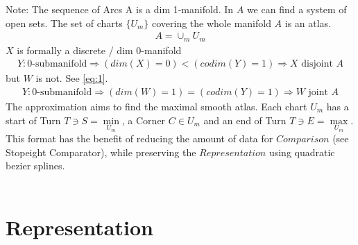 \documentclass{report}
\begin{document}
Note: The sequence of Arcs A is a dim 1-manifold. In $A$ we can find a system of open sets. The set of charts $\{U_{m}\}$ covering the whole manifold $A$ is an atlas. ~\cite[3.1.1.]{Fomenko} ~\cite[4.5]{Wall}
\begin{align}
A = \cup_{m}U_{m}
\end{align}
$X$ is formally a discrete / dim 0-manifold
\begin{align}
Y: \text{0-submanifold} \Rightarrow (dim(X)=0)<(codim(Y)=1) \Rightarrow X \text{ disjoint } A
\end{align}
but $W$ is not. See \eqref{eq:1}.
\begin{align}
Y: \text{0-submanifold} \Rightarrow (dim(W)=1)=(codim(Y)=1) \Rightarrow W \text{ joint } A
\end{align}
The approximation aims to find the maximal smooth atlas. Each chart $U_{m}$ has a start of Turn $T \ni S = \min \limits _{U_{m}}$, a Corner $C \in U_{m}$ and an end of Turn $T \ni E = \max \limits _{U_{m}}$. This format has the benefit of reducing the amount of data for $Comparison$ (see Stopeight Comparator), while preserving the $Representation$ using quadratic bezier splines.\\\\

\chapter{Representation}
\end{document}
